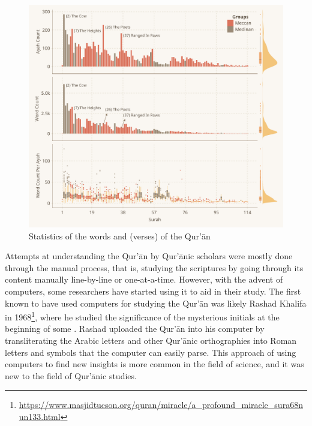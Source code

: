 \begin{figure}[!b]
    \centering
    \includegraphics[width=\textwidth]{img/plot1.pdf}
    \caption{Statistics of the words and   (verses) of the Qur'\=an}
    \label{fig:ayah_word_count}
\end{figure}

Attempts at understanding the Qur'\=an by Qur'\=anic scholars were mostly done through the manual process, that is, studying the scriptures by going through its content manually line-by-line or one-at-a-time. However, with the advent of computers, some researchers have started using it to aid in their study. The first known to have used computers for studying the Qur'\=an was likely Rashad Khalifa in 1968\footnote{\url{https://www.masjidtucson.org/quran/miracle/a_profound_miracle_sura68nun133.html}}, where he studied the significance of the mysterious initials at the beginning of some  . Rashad uploaded the Qur'\=an into his computer by transliterating the Arabic letters and other Qur'\=anic orthographies into Roman letters and symbols that the computer can easily parse. This approach of using computers to find new insights is more common in the field of science, and it was new to the field of Qur'\=anic studies.

